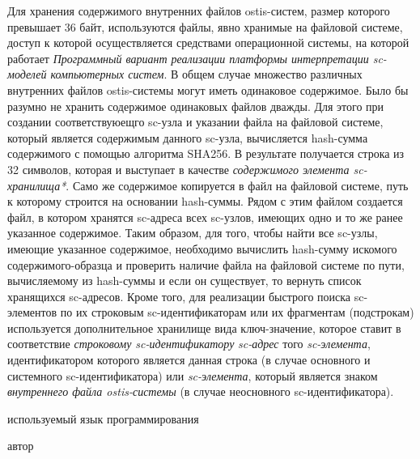 \begin{scnitemize}

Для хранения содержимого внутренних файлов ostis-систем, размер которого превышает 36 байт, используются файлы, явно
хранимые на файловой системе, доступ к которой осуществляется средствами операционной системы, на которой работает
\textit{Программный вариант реализации платформы интерпретации sc-моделей компьютерных систем}. В общем случае множество
различных внутренних файлов ostis-системы могут иметь одинаковое содержимое. Было бы разумно не хранить содержимое
одинаковых файлов дважды. Для этого при создании соответствуюещго sc-узла и указании файла на файловой системе, который
является содержимым данного sc-узла, вычисляется hash-сумма содержимого с помощью алгоритма SHA256. В результате получается
строка из 32 символов, которая и выступает в качестве \textit{содержимого элемента sc-хранилища*}. Само же содержимое
копируется в файл на файловой системе, путь к которому строится на основании hash-суммы. Рядом с этим файлом
создается файл, в котором хранятся sc-адреса всех sc-узлов, имеющих одно и то же ранее указанное содержимое.
Таким образом, для того, чтобы найти все sc-узлы, имеющие указанное содержимое, необходимо вычислить hash-сумму
искомого содержимого-образца и проверить наличие файла на файловой системе по пути, вычисляемому из hash-суммы и если
он существует, то вернуть список хранящихся sc-адресов. Кроме того, для реализации быстрого поиска
sc-элементов по их строковым sc-идентификаторам или их фрагментам (подстрокам) используется дополнительное
хранилище вида ключ-значение, которое ставит в соответствие \textit{строковому sc-идентификатору} \textit{sc-адрес}
того \textit{sc-элемента}, идентификатором которого является данная строка (в случае основного и системного sc-идентификатора)
или \textit{sc-элемента}, который является знаком \textit{внутреннего файла ostis-системы} (в случае неосновного
sc-идентификатора).

\begin{SCn}
\begin{scnrelfromlist}{используемый язык программирования}
\end{scnrelfromlist}
\begin{scnrelfromlist}{автор}
\end{scnrelfromlist}
\end{SCn}


\end{scnitemize}
